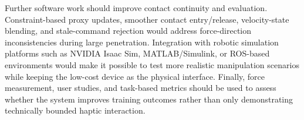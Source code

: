Further software work should improve contact continuity and evaluation. Constraint-based proxy updates, smoother contact entry/release, velocity-state blending, and stale-command rejection would address force-direction inconsistencies during large penetration. Integration with robotic simulation platforms such as NVIDIA Isaac Sim, MATLAB/Simulink, or ROS-based environments would make it possible to test more realistic manipulation scenarios while keeping the low-cost device as the physical interface. Finally, force measurement, user studies, and task-based metrics should be used to assess whether the system improves training outcomes rather than only demonstrating technically bounded haptic interaction.
